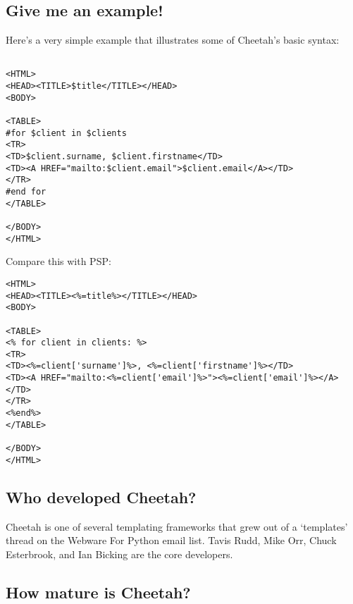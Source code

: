 \subsection{Give me an example!}
\label{intro.whatIs}

Here's a very simple example that illustrates some of Cheetah's basic syntax:

\begin{verbatim}

<HTML>
<HEAD><TITLE>$title</TITLE></HEAD>
<BODY>

<TABLE>
#for $client in $clients
<TR>
<TD>$client.surname, $client.firstname</TD>
<TD><A HREF="mailto:$client.email">$client.email</A></TD>
</TR>
#end for
</TABLE>

</BODY>
</HTML>
\end{verbatim}

Compare this with PSP:

\begin{verbatim}
<HTML>
<HEAD><TITLE><%=title%></TITLE></HEAD>
<BODY>

<TABLE>
<% for client in clients: %>
<TR>
<TD><%=client['surname']%>, <%=client['firstname']%></TD>
<TD><A HREF="mailto:<%=client['email']%>"><%=client['email']%></A></TD>
</TR>
<%end%>
</TABLE>

</BODY>
</HTML>
\end{verbatim}



\subsection{Who developed Cheetah?}
\label{intro.developers}

Cheetah is one of several templating frameworks that grew out of a `templates'
thread on the Webware For Python email list.  Tavis Rudd, Mike Orr, Chuck
Esterbrook, and Ian Bicking are the core developers.

\subsection{How mature is Cheetah?}
\label{intro.mature}

